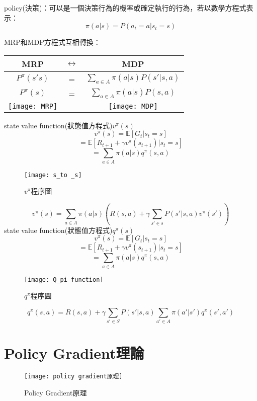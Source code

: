 \begin{flushleft}
policy(決策)：可以是一個決策行為的機率或確定執行的行為，若以數學方程式表示：
$$\pi (a|s) = P(a_t=a|s_t=s)$$
\newpage

MRP和MDP方程式互相轉換：\\
\end{flushleft}
\begin{center}
\begin{tabular}[c]{ccc}    
 MRP & $\longleftrightarrow$ & MDP\\
\hline
$P^{\pi}(s's)$ & = & $\sum_{a\in A}\pi (a|s)P(s'|s, a)$\\
$P^{\pi}(s)$ & = & $\sum_{a\in A}\pi (a|s)P(s, a)$\\
\texttt{[image: MRP]}&&\texttt{[image: MDP]}\\
\hline
\end{tabular}
\end{center}
\hspace{15pt}
 
state value function(狀態值方程式)$v^{\pi}(s)$\\
$$v^{\pi}(s) = \mathbb{E}[G_t|s_t=s]$$
$$= \mathbb{E}[R_{t+1}+\gamma v^{\pi}(s_{t+1})|s_t=s]$$
$$= \sum_{a\in A}\pi (a|s)q^{\pi}(s, a)$$
\begin{figure}[hbt!]
\begin{center}
\texttt{[image: s\_to \_s]}
\caption{$v^{\pi}$程序圖}
\label{fig.s_to_s}
\end{center}
\end{figure}
$$v^{\pi}(s) = \sum_{a\in A}\pi (a|s)(R(s, a)+\gamma \sum_{s'\in s}P(s'|s, a)v^{\pi}(s'))$$
\newpage
state value function(狀態值方程式)$q^{\pi}(s)$
$$v^{\pi}(s) = \mathbb{E}[G_t|s_t=s]$$
$$= \mathbb{E}[R_{t+1}+\gamma v^{\pi}(s_{t+1})|s_t=s]$$
$$= \sum_{a\in A}\pi (a|s)q^{\pi}(s, a)$$
\begin{figure}[hbt!]
\begin{center}
\texttt{[image: Q\_pi function]}
\caption{$q^{\pi}$程序圖}
\label{fig.q_pi}
\end{center}
\end{figure}
$$q^\pi(s, a)=R(s, a)+\gamma\sum_{s'\in S}P(s'|s, a)\sum_{a'\in A}\pi(a'|s')q^{\pi}(s', a')$$
\newpage
\section{Policy Gradient理論}
\begin{figure}[hbt!]
\begin{center}
\texttt{[image: policy gradient原理]}
\caption{\Large Policy Gradient原理}
\label{Policy Gradient原理}
\end{center}
\end{figure}

